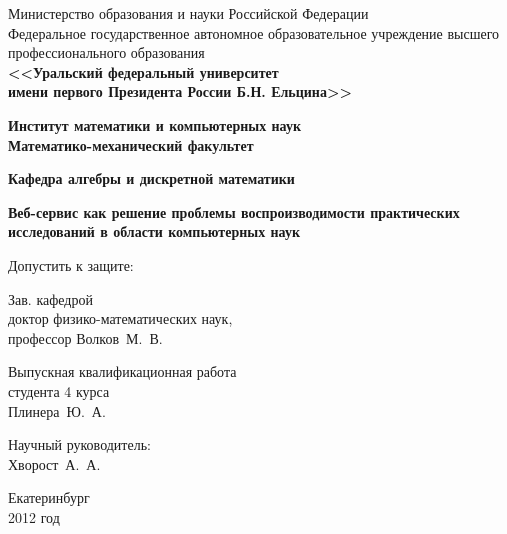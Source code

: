 \documentclass[12pt]{article}
\begin{document}
{\thispagestyle{empty}
\begin{center}
\scriptsize Министерство образования и науки Российской Федерации\\
\scriptsize Федеральное государственное автономное образовательное учреждение высшего профессионального образования\\
\small\bf <<Уральский федеральный университет\\
\small\bf имени первого Президента России Б.Н. Ельцина>>
\end{center}

\begin{center}
\normalsize\bf Институт математики и компьютерных наук\\
\normalsize\bf Математико-механический факультет\\
\end{center}
\begin{center}
\normalsize\bf Кафедра алгебры и дискретной математики\\
\end{center}

\vspace{3cm}

\begin{center}
\Large\bf Веб-сервис как решение проблемы воспроизводимости практических исследований в области компьютерных наук
\end{center}

\vspace{3.5cm}

\hspace{-1cm}
\begin{minipage}{80mm}
 \noindent
 \vspace{-2.3cm}
	\begin{flushleft}
		\normalsize Допустить к защите:\\
	\end{flushleft}
	
	\begin{flushleft}
		\normalsize Зав. кафедрой\\
		\normalsize доктор физико-математических наук,\\
		\normalsize профессор Волков~М.~В.
	\end{flushleft}
\end{minipage}
\begin{minipage}{85mm}
	\begin{flushright}
		\normalsize Выпускная квалификационная работа\\
		\normalsize студента 4 курса\\
		\normalsize Плинера~Ю.~А.
	\end{flushright}
	
	\vspace{0.5cm}
	
	\begin{flushright}
		\normalsize Научный руководитель:\\
		\normalsize Хворост~А.~А.
	\end{flushright}
\end{minipage}

\vspace{4cm}

\begin{center}
Екатеринбург\\
2012 год
\end{center}

}
\end{document}
